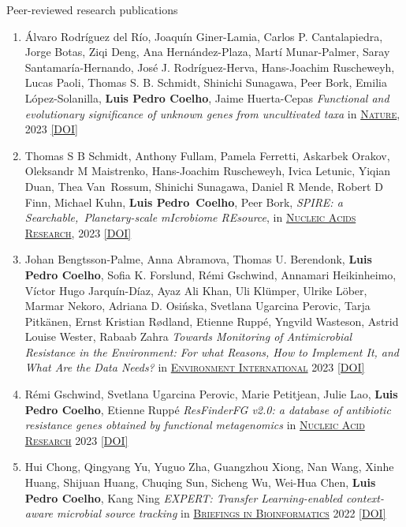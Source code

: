\documentclass{article}
\renewcommand\subsubsection[1]{%
    \par\vspace{.1em}%
    {\hspace{1em}\subsubsubhead #1}%
    \par\vspace{.2em}%
}
\newcommand\showdoi[1]{%
    \href{http://dx.doi.org/#1}{[DOI]}%
}
\newcommand\pubname[1]{\textsc{\uline{#1}}}
\begin{document}
\subsubsection{Peer-reviewed research publications}

\begin{enumerate}[resume]
\item Álvaro Rodríguez del Río, Joaquín Giner-Lamia, Carlos P. Cantalapiedra, Jorge Botas, Ziqi Deng, Ana Hernández-Plaza, Martí Munar-Palmer, Saray Santamaría-Hernando, José J. Rodríguez-Herva, Hans-Joachim Ruscheweyh, Lucas Paoli, Thomas S. B. Schmidt, Shinichi Sunagawa, Peer Bork, Emilia López-Solanilla, \textbf{Luis Pedro Coelho}, Jaime Huerta-Cepas \emph{Functional and evolutionary significance of unknown genes from uncultivated taxa} in \pubname{Nature}, 2023 \showdoi{10.1038/s41586-023-06955-z}

\item Thomas S B Schmidt, Anthony Fullam, Pamela Ferretti, Askarbek Orakov, Oleksandr M Maistrenko, Hans-Joachim Ruscheweyh, Ivica Letunic, Yiqian Duan, Thea Van Rossum, Shinichi Sunagawa, Daniel R Mende, Robert D Finn, Michael Kuhn, \textbf{Luis Pedro Coelho}, Peer Bork, \emph{SPIRE: a Searchable, Planetary-scale mIcrobiome REsource}, in \pubname{Nucleic Acids Research}, 2023 \showdoi{10.1093/nar/gkad943}

\item Johan Bengtsson-Palme, Anna Abramova, Thomas U. Berendonk, \textbf{Luis Pedro Coelho}, Sofia K. Forslund, Rémi Gschwind, Annamari Heikinheimo, Víctor Hugo Jarquín-Díaz, Ayaz Ali Khan, Uli Klümper, Ulrike Löber, Marmar Nekoro, Adriana D. Osińska, Svetlana Ugarcina Perovic, Tarja Pitkänen, Ernst Kristian Rødland, Etienne Ruppé, Yngvild Wasteson, Astrid Louise Wester, Rabaab Zahra \emph{Towards Monitoring of Antimicrobial Resistance in the Environment: For what Reasons, How to Implement It, and What Are the Data Needs?} in \pubname{Environment International} 2023 \showdoi{10.1016/j.envint.2023.108089}

\item Rémi Gschwind, Svetlana Ugarcina Perovic, Marie Petitjean, Julie Lao, \textbf{Luis Pedro Coelho}, Etienne Ruppé \emph{ResFinderFG v2.0: a database of antibiotic resistance genes obtained by functional metagenomics} in \pubname{Nucleic Acid Research} 2023 \showdoi{10.1093/nar/gkad384}

\item Hui Chong, Qingyang Yu, Yuguo Zha, Guangzhou Xiong, Nan Wang, Xinhe Huang, Shijuan Huang, Chuqing Sun, Sicheng Wu, Wei-Hua Chen, \textbf{Luis Pedro Coelho}, Kang Ning \emph{EXPERT: Transfer Learning-enabled context-aware microbial source tracking} in \pubname{Briefings in Bioinformatics} 2022 \showdoi{10.1093/bib/bbac396}


\end{enumerate}
\end{document}
